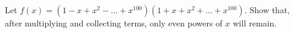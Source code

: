 Let $f(x) = \left(1 - x + x^2 - \ldots + x^{100}\right)\left(1 + x + x^2 + \ldots + x^{100}\right)$. Show that, after multiplying and collecting terms, only even powers of $x$ will remain.
